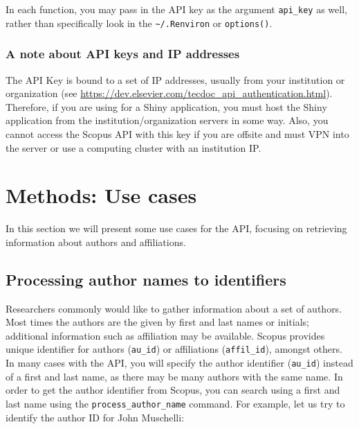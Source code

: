 In each function, you may pass in the API key as the argument
\texttt{api\_key} as well, rather than specifically look in the
\texttt{\textasciitilde{}/.Renviron} or \texttt{options()}.

\hypertarget{a-note-about-api-keys-and-ip-addresses}{%
\subsubsection{A note about API keys and IP
addresses}\label{a-note-about-api-keys-and-ip-addresses}}

The API Key is bound to a set of IP addresses, usually from your
institution or organization (see
\url{https://dev.elsevier.com/tecdoc_api_authentication.html}).
Therefore, if you are using  for a Shiny application, you
must host the Shiny application from the institution/organization
servers in some way. Also, you cannot access the Scopus API with this
key if you are offsite and must VPN into the server or use a computing
cluster with an institution IP.

\hypertarget{methods-use-cases}{%
\section{Methods: Use cases}\label{methods-use-cases}}

In this section we will present some use cases for the API, focusing on
retrieving information about authors and affiliations.

\hypertarget{processing-author-names-to-identifiers}{%
\subsection{Processing author names to
identifiers}\label{processing-author-names-to-identifiers}}

Researchers commonly would like to gather information about a set of
authors. Most times the authors are the given by first and last names or
initials; additional information such as affiliation may be available.
Scopus provides unique identifier for authors (\texttt{au\_id}) or
affiliations (\texttt{affil\_id}), amongst others. In many cases with
the API, you will specify the author identifier (\texttt{au\_id})
instead of a first and last name, as there may be many authors with the
same name. In order to get the author identifier from Scopus, you can
search using a first and last name using the
\texttt{process\_author\_name} command. For example, let us try to
identify the author ID for John Muschelli:

